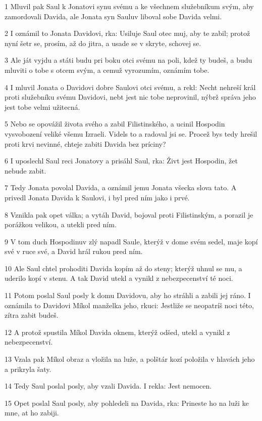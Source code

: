 \par 1 Mluvil pak Saul k Jonatovi synu svému a ke všechnem služebníkum svým, aby zamordovali Davida, ale Jonata syn Sauluv liboval sobe Davida velmi.
\par 2 I oznámil to Jonata Davidovi, rka: Usiluje Saul otec muj, aby te zabil; protož nyní šetr se, prosím, až do jitra, a usade se v skryte, schovej se.
\par 3 Ale ját vyjdu a státi budu pri boku otci svému na poli, kdež ty budeš, a budu mluviti o tobe s otcem svým, a cemuž vyrozumím, oznámím tobe.
\par 4 I mluvil Jonata o Davidovi dobre Saulovi otci svému, a rekl: Necht nehreší král proti služebníku svému Davidovi, nebt jest nic tobe neprovinil, nýbrž správa jeho jest tobe velmi užitecná.
\par 5 Nebo se opovážil života svého a zabil Filistinského, a ucinil Hospodin vysvobození veliké všemu Izraeli. Videls to a radoval jsi se. Procež bys tedy hrešil proti krvi nevinné, chteje zabiti Davida bez príciny?
\par 6 I uposlechl Saul reci Jonatovy a prisáhl Saul, rka: Živt jest Hospodin, žet nebude zabit.
\par 7 Tedy Jonata povolal Davida, a oznámil jemu Jonata všecka slova tato. A privedl Jonata Davida k Saulovi, i byl pred ním jako i prvé.
\par 8 Vznikla pak opet válka; a vytáh David, bojoval proti Filistinským, a porazil je porážkou velikou, a utekli pred ním.
\par 9 V tom duch Hospodinuv zlý napadl Saule, kterýž v dome svém sedel, maje kopí své v ruce své, a David hrál rukou pred ním.
\par 10 Ale Saul chtel prohoditi Davida kopím až do steny; kterýž uhnul se mu, a uderilo kopí v stenu. A tak David utekl a vynikl z nebezpecenství té noci.
\par 11 Potom poslal Saul posly k domu Davidovu, aby ho stráhli a zabili jej ráno. I oznámila to Davidovi Míkol manželka jeho, rkuci: Jestliže se neopatríš noci této, zítra zabit budeš.
\par 12 A protož spustila Míkol Davida oknem, kterýž odšed, utekl a vynikl z nebezpecenství.
\par 13 Vzala pak Míkol obraz a vložila na luže, a polštár kozí položila v hlavách jeho a prikryla šaty.
\par 14 Tedy Saul poslal posly, aby vzali Davida. I rekla: Jest nemocen.
\par 15 Opet poslal Saul posly, aby pohledeli na Davida, rka: Prineste ho na luži ke mne, at ho zabiji.
